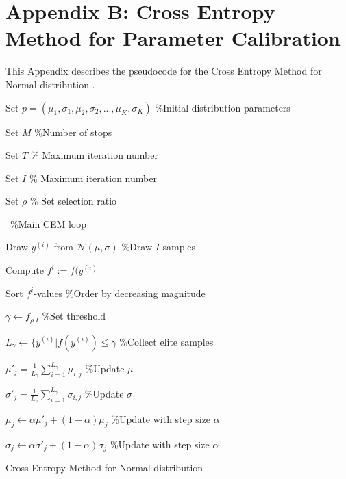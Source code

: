 \section*{Appendix B: Cross Entropy Method for Parameter Calibration}

This Appendix describes the pseudocode for the Cross Entropy Method for Normal distribution \citep{rubinstein1999cross}. 

\begin{algorithm} [H]	
	\SetAlgoLined
	Set $p=(\mu_1,\sigma_1,\mu_2,\sigma_2,...,\mu_K,\sigma_K)$ \quad \%Initial distribution parameters 
	
	Set $M$ \quad     \%Number of stops
	
	Set $T$  \quad  \% Maximum iteration number
	
	Set $I$  \quad  \% Maximum iteration number 
	
	Set $\rho$  \quad \% Set selection ratio
	
	 { \  \%Main CEM loop
	
	     {
	
	Draw $y^{(i)}$ from $\mathcal{N}(\mu,\sigma)$  \quad  \%Draw $I$ samples
	
	Compute $f^i:=f(y^{(i)}$}
	
	Sort $f^i$-values \quad  \%Order by decreasing magnitude
	
	$\gamma \leftarrow f_{\rho.I}$ \quad  \%Set threshold 
	
	$L_\gamma \leftarrow \{ y^{(i)} | f(y^{(i)}) \leq \gamma$  \quad  \%Collect elite samples 
	
	$\mu'_j = \frac{1}{L_\gamma} \sum_{i=1}^{L_\gamma} \mu_{i,j}$  \quad  \%Update $\mu$

	$\sigma'_j = \frac{1}{L_\gamma} \sum_{i=1}^{L_\gamma} \sigma_{i,j}$   \quad  \%Update $\sigma$
	
	$\mu_j \leftarrow \alpha \mu'_j + (1 - \alpha)  \mu_j$ \quad \%Update with step size $\alpha$
	
	$\sigma_j \leftarrow \alpha \sigma'_j + (1 - \alpha)  \sigma_j$ \quad \%Update with step size $\alpha$
	}
	\caption{Cross-Entropy Method for Normal distribution}
	\label{algo:CEM}
\end{algorithm}
